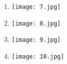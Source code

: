 \begin{question}
  
   \begin{enumerate}[label=\alph*)]
   
   		\item 
   		   		\begin{minipage}[H]{\linewidth}                       
			\texttt{[image: 7.jpg]}   		
       \end{minipage}
   		
   		\item 
   		\begin{minipage}[H]{\linewidth}                       
			\texttt{[image: 8.jpg]}   		
       \end{minipage}   		
   		\item 
   		\begin{minipage}[H]{\linewidth}                       
			\texttt{[image: 9.jpg]}   		
       \end{minipage}   		
   		\item 
   		\begin{minipage}[H]{\linewidth}                       
			\texttt{[image: 10.jpg]}   		
       \end{minipage}   	
       
   \end{enumerate}
\end{question}

\newpage